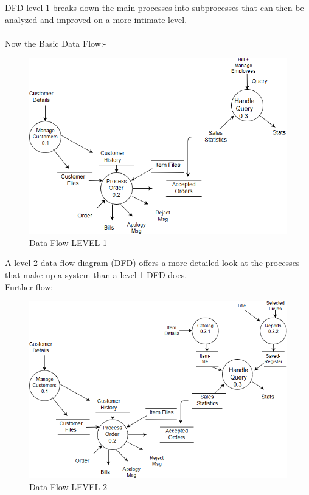 DFD level 1 breaks down the main processes into subprocesses that can then be analyzed and improved on a more intimate level.\\\\
Now the Basic Data Flow:-

\begin{figure}[h!]
\centering \includegraphics[scale=0.5]{input/images/dfdlevel1.png}
\caption{Data Flow LEVEL 1}
\label{fig:DFDs}
\end{figure}
\newpage
A level 2 data flow diagram (DFD) offers a more detailed look at the processes that make up a system than a level 1 DFD does.\\
Further flow:-

\begin{figure}[h!]
\centering \includegraphics[scale=0.7]{input/images/dfdlevel2.png}
\caption{Data Flow LEVEL 2}
\label{fig:DFDs}
\end{figure}

